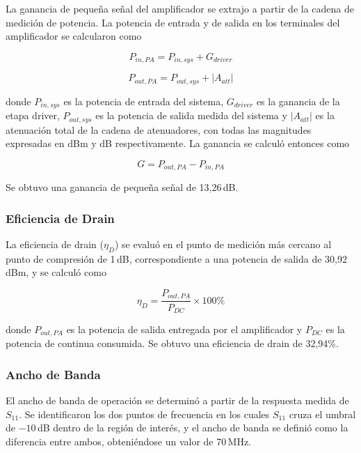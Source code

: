 La ganancia de pequeña señal del amplificador se extrajo a partir de la cadena de medición de potencia. La potencia de entrada y de salida en los terminales del amplificador se calcularon como

\begin{equation}
P_{in,PA} = P_{in,sys} + G_{driver}
\label{eq:pin_pa}
\end{equation}

\begin{equation}
P_{out,PA} = P_{out,sys} + |A_{att}|
\label{eq:pout_pa}
\end{equation}

donde $P_{in,sys}$ es la potencia de entrada del sistema, $G_{driver}$ es la ganancia de la etapa driver, $P_{out,sys}$ es la potencia de salida medida del sistema y $|A_{att}|$ es la atenuación total de la cadena de atenuadores, con todas las magnitudes expresadas en dBm y dB respectivamente. La ganancia se calculó entonces como

\begin{equation}
G = P_{out,PA} - P_{in,PA}
\label{eq:gain_calc}
\end{equation}

Se obtuvo una ganancia de pequeña señal de 13{,}26\,dB.

\subsubsection{Eficiencia de Drain}
La eficiencia de drain ($\eta_D$) se evaluó en el punto de medición más cercano al punto de compresión de 1\,dB, correspondiente a una potencia de salida de 30{,}92\,dBm, y se calculó como

\begin{equation}
\eta_D = \frac{P_{out,PA}}{P_{DC}} \times 100\%
\label{eq:drain_eff}
\end{equation}

donde $P_{out,PA}$ es la potencia de salida entregada por el amplificador y $P_{DC}$ es la potencia de continua consumida. Se obtuvo una eficiencia de drain de 32{,}94\%.

\subsubsection{Ancho de Banda}
El ancho de banda de operación se determinó a partir de la respuesta medida de $S_{11}$. Se identificaron los dos puntos de frecuencia en los cuales $S_{11}$ cruza el umbral de $-10$\,dB dentro de la región de interés, y el ancho de banda se definió como la diferencia entre ambos, obteniéndose un valor de 70\,MHz.


